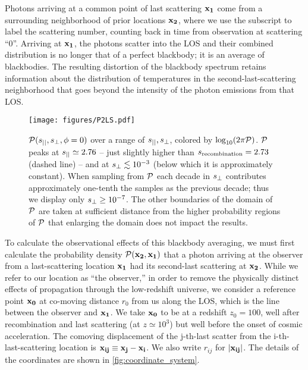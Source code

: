 \documentclass[fleqn,usenatbib]{mnras}
\begin{document}
    Photons arriving at a common point of last scattering $\mathbf{x_1}$ come from
    a surrounding neighborhood of prior locations $\mathbf{x_2}$, where we use the
    subscript to label the scattering number, counting back in time from
    observation at scattering ``0''.  Arriving at $\mathbf{x_1}$, the photons
    scatter into the LOS and their combined distribution is no longer that of a
    perfect blackbody; it is an average of blackbodies.  The resulting
    distortion of the blackbody spectrum retains information about the
    distribution of temperatures in the second-last-scattering neighborhood that
    goes beyond the intensity of the photon emissions from that LOS.

    \begin{figure}
        \centering
        \texttt{[image: figures/P2LS.pdf]}
        \vspace{-20pt}
        \caption{%
            $\mathcal{P}(s_{||}, s_{\perp}, \phi=0)$ over a range of $s_{||}, s_{\perp}$,
            colored by $\log_{10}\!\left(2\pi\mathcal{P}\right)$.  $\mathcal{P}$ peaks
            at $s_{||}\simeq 2.76$ -- just slightly higher than $s_{\rm recombination}=2.73$
            (dashed line) -- and at $s_{\perp} \lesssim 10^{-3}$ (below which it is
            approximately constant).  When sampling from $\mathcal{P}$ each decade
            in $s_{\perp}$ contributes approximately one-tenth the samples as the
            previous decade; thus we display only  $s_{\perp} \geq 10^{-7}$.  The
            other boundaries of the domain of $\mathcal{P}$ are taken at sufficient
            distance from the higher probability regions of $\mathcal{P}$ that
            enlarging the domain does not impact the results.%
        }
        \label{fig:P2LS}
    \end{figure}

    To calculate the observational effects of this blackbody averaging, we must
    first calculate the probability density $\mathcal{P}(\mathbf{x_2},\mathbf{x_1})$ that
    a photon arriving at the observer from a last-scattering location
    $\mathbf{x_1}$ had its second-last scattering at $\mathbf{x_2}$.  While we refer
    to our location as ``the observer,'' in order to remove the physically
    distinct effects of propagation through the low-redshift universe, we
    consider a reference point $\mathbf{x_0}$ at co-moving distance $r_0$ from us
    along the LOS, which is the line between the observer and $\mathbf{x_1}$.  We
    take $\mathbf{x_0}$ to be at a redshift $z_0=100$, well after recombination and
    last scattering (at $z\simeq10^3$) but well before the onset of cosmic
    acceleration.  The comoving displacement of the j-th-last scatter from the
    i-th-last-scattering location is $\mathbf{x_{ij}}\equiv\mathbf{x_j}-\mathbf{x_i}$.
    We also write $r_{ij}$ for $\lvert \mathbf{x_{ij}} \rvert$. The details of the
    coordinates are shown in \autoref{fig:coordinate_system}.
\end{document}
